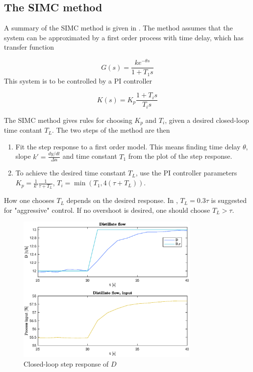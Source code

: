 \documentclass[12pt]{article}
\begin{document}
\subsection{The SIMC method}
A summary of the SIMC method is given in \cite{regtek}. The method assumes that the system can be approximated by a first order process with time delay, which has transfer function

\begin{equation}
G(s) = \frac{k e^{-\theta s}}{1 + T_1 s}
\end{equation}
This system is to be controlled by a PI controller

\begin{equation}
K(s) = K_p\frac{1 + T_i s}{T_i s}
\end{equation}

The SIMC method gives rules for choosing $K_p$ and $T_i$, given a desired closed-loop time contant $T_L$. The two steps of the method are then

\begin{enumerate}
\item Fit the step response to a first order model. This means finding time delay $\theta$, slope $k' = \frac{dy/dt}{\Delta u}$ and time constant $T_1$ from the plot of the step response.
\item To achieve the desired time constant $T_L$, use the PI controller parameters $K_p = \frac{1}{k'} \frac{1}{\tau + T_L}$, $T_i = \min(T_1, 4(\tau + T_L))$.
\end{enumerate}
How one chooses $T_L$ depends on the desired response. In \cite{regtek}, $T_L = 0.3\tau$ is suggested for "aggressive" control. If no overshoot is desired, one should choose $T_L > \tau$.

\begin{figure}[p]
\centering
\includegraphics[width=0.8\textwidth]{../Systemanalyse/Log_Data_to_Matlab/Figurer/Stegeksperimenter/FC1005_step.eps}
\caption{Closed-loop step response of $D$}
\label{fig:cl_step_FC1005}
\end{figure}
\end{document}
